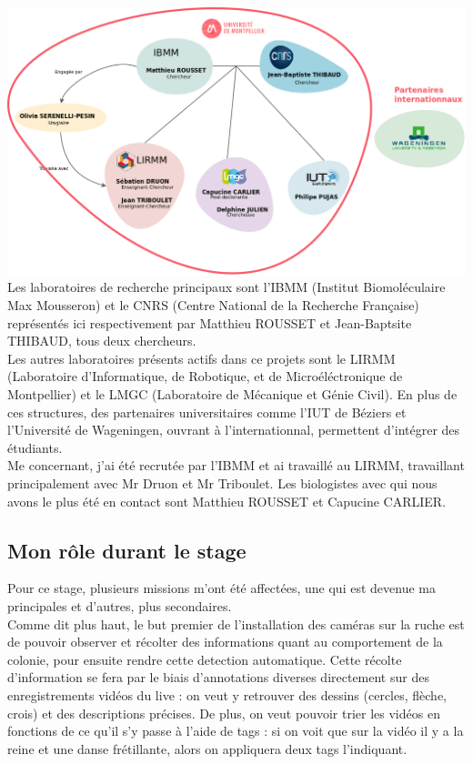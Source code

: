 \documentclass[11pt,french,a4paper]{report}
\begin{document}
\includegraphics[scale=0.3]{../images/dia/organiramme_equipe_projet.png} \\

Les laboratoires de recherche principaux sont l'IBMM (Institut Biomoléculaire Max Mousseron) 
et le CNRS (Centre National de la Recherche Française) représentés ici respectivement par Matthieu ROUSSET et Jean-Baptsite THIBAUD, 
tous deux chercheurs. \\
Les autres laboratoires présents actifs dans ce projets sont le LIRMM (Laboratoire d'Informatique, de Robotique, 
et de Microéléctronique de Montpellier) et le LMGC (Laboratoire de Mécanique et Génie Civil). En plus de ces structures, 
des partenaires universitaires comme l'IUT de Béziers et l'Université de Wageningen, ouvrant à l'internationnal,
permettent d'intégrer des étudiants. \\
Me concernant, j'ai été recrutée par l'IBMM et ai travaillé au LIRMM, travaillant principalement avec Mr Druon et 
Mr Triboulet. Les biologistes avec qui nous avons le plus été en contact sont Matthieu ROUSSET et Capucine CARLIER. \\


\subsection{Mon rôle durant le stage}
Pour ce stage, plusieurs missions m'ont été affectées, une qui est devenue ma principales et d'autres, plus secondaires.\\

Comme dit plus haut, le but premier de l'installation des caméras sur la ruche est de pouvoir observer et récolter des informations
quant au comportement de la colonie, pour ensuite rendre cette detection automatique. Cette récolte d'information se fera par le 
biais d'annotations diverses directement sur des enregistrements vidéos du live : on veut y retrouver des dessins (cercles, 
flèche, crois) et des descriptions précises. De plus, on veut pouvoir trier les vidéos en fonctions de ce qu'il s'y passe
à l'aide de tags : si on voit que sur la vidéo il y a la reine et une danse frétillante, alors on appliquera deux tags l'indiquant. \\
\end{document}

